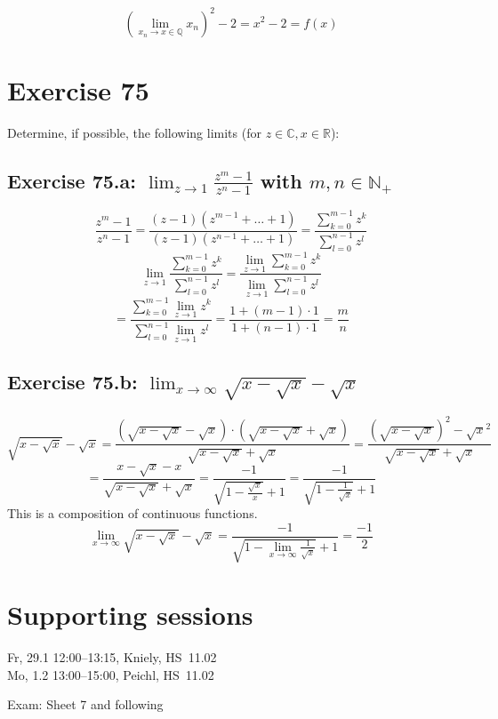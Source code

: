 \documentclass[a4paper]{article}
\theoremstyle{definition}
\begin{document}
\[ \left(\lim_{x_n \to x \in \mathbb Q} x_n\right)^2 - 2 = x^2 - 2 = f(x) \]

\section{Exercise 75}
\begin{ex}
  Determine, if possible, the following limits (for $z \in \mathbb C, x \in \mathbb R$):
\end{ex}

\subsection{Exercise 75.a: $\lim_{z\to1} \frac{z^m - 1}{z^n - 1}$ with $m,n \in \mathbb N_+$}
%
\[
  \frac{z^m - 1}{z^n - 1} = \frac{(z - 1)(z^{m-1} + \ldots + 1)}{(z - 1)(z^{n-1} + \ldots + 1)}
    = \frac{\sum_{k=0}^{m-1} z^k}{\sum_{l=0}^{n-1} z^l}
\] \[
  \lim_{z\to 1} \frac{\sum_{k=0}^{m-1} z^k}{\sum_{l=0}^{n-1} z^l}
    = \frac{\lim_{z\to1} \sum_{k=0}^{m-1} z^k}{\lim_{z\to1} \sum_{l=0}^{n-1} z^l}
\] \[
  = \frac{\sum_{k=0}^{m-1} \lim_{z\to1} z^k}{\sum_{l=0}^{n-1} \lim_{z\to1} z^l}
  = \frac{1 + (m - 1) \cdot 1}{1 + (n - 1) \cdot 1} = \frac mn
\]

\subsection{Exercise 75.b: $\lim_{x\to\infty} \sqrt{x - \sqrt{x}} - \sqrt{x}$}
%
\[
  \sqrt{x - \sqrt{x}} - \sqrt{x}
    = \frac{\left(\sqrt{x - \sqrt{x}} - \sqrt{x}\right) \cdot \left(\sqrt{x - \sqrt{x}} + \sqrt{x}\right)}{\sqrt{x - \sqrt{x}} + \sqrt{x}}
    = \frac{\left(\sqrt{x - \sqrt{x}}\right)^2 - \sqrt{x}^2}{\sqrt{x - \sqrt{x}} + \sqrt{x}}
\] \[
  = \frac{x - \sqrt{x} - x}{\sqrt{x - \sqrt{x}} + \sqrt{x}}
    = \frac{-1}{\sqrt{1 - \frac{\sqrt{x}}{x}} + 1}
    = \frac{-1}{\sqrt{1 - \frac{1}{\sqrt{x}}} + 1}
\]
This is a composition of continuous functions.
\[
  \lim_{x\to\infty} \sqrt{x - \sqrt{x}} - \sqrt{x}
    = \frac{-1}{\sqrt{1 - \lim_{x\to\infty} \frac{1}{\sqrt{x}}} + 1} = \frac{-1}{2}
\]

\section{Supporting sessions}

Fr, 29.1 12:00--13:15, Kniely, HS~11.02 \\
Mo, 1.2 13:00--15:00, Peichl, HS~11.02

Exam: Sheet 7 and following
\end{document}
